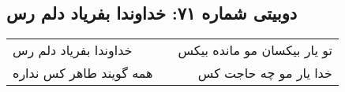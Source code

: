 \begin{center}
\section*{دوبیتی شماره ۷۱: خداوندا بفریاد دلم رس}
\label{sec:071}
\begin{longtable}{l p{0.5cm} r}
خداوندا بفریاد دلم رس
&&
تو یار بیکسان مو مانده بیکس
\\
همه گویند طاهر کس نداره
&&
خدا یار مو چه حاجت کس
\\
\end{longtable}
\end{center}
